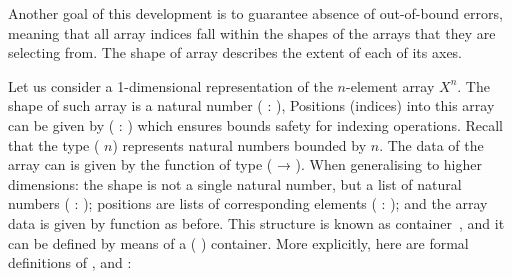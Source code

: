 Another goal of this development is to guarantee absence of out-of-bound errors,
meaning that all array indices fall within the shapes of the arrays that
they are selecting from.  The shape of array describes the extent of each
of its axes.  

Let us consider a 1-dimensional representation of the $n$-element array
$X^n$.  The shape of such array is a natural number ( : ),
Positions (indices) into this array can be given by
( :  ) which ensures bounds safety for indexing operations.
Recall that the type ( $n$) represents natural numbers bounded by $n$.
The data of the array can is given by the function of type (  → ). 
When generalising to higher dimensions: the shape is not a single natural number,
but a list of natural numbers ( : ); positions are lists
of corresponding  elements ( :  ); and the
array data is given by function as before.  This structure is known
as container~\cite{cont1,cont2,ix-containers}, and it can be defined by means of a 
(   ) container.  More explicitly,
here are formal definitions of ,  and :
